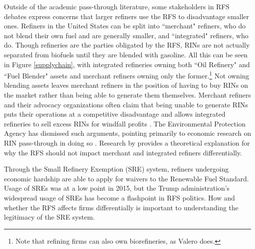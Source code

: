 \documentclass[11pt]{article}
\begin{document}
Outside of the academic pass-through literature, some stakeholders in RFS debates express concerns that larger refiners use the RFS to disadvantage smaller ones. Refiners in the United States can be split into ``merchant" refiners, who do not blend their own fuel and are generally smaller, and ``integrated" refiners, who do. Though refineries are the parties obligated by the RFS, RINs are not actually separated from biofuels until they are blended with gasoline. All this can be seen in Figure \ref{supplychain}, with integrated refineries owning both ``Oil Refinery" and ``Fuel Blender" assets and merchant refiners owning only the former.\footnote{Note that refining firms can also own biorefineries, as Valero does.}  Not owning blending assets leaves merchant refiners in the position of having to buy RINs on the market rather than being able to generate them themselves. Merchant refiners and their advocacy organizations often claim that being unable to generate RINs puts their operations at a competitive disadvantage and allows integrated refineries to sell excess RINs for windfall profits \citep[see discussion and footnotes in][p. 21-31]{EnvironmentalProtectionAgency2017}. The Environmental Protection Agency has dismissed such arguments, pointing primarily to economic research on RIN pass-through in doing so \citep{EnvironmentalProtectionAgency2017}. Research by \cite{Babcock2016} provides a theoretical explanation for why the RFS should not impact merchant and integrated refiners differentially. 

Through the Small Refinery Exemption (SRE) system, refiners undergoing economic hardship are able to apply for waivers to the Renewable Fuel Standard. Usage of SREs was at a low point in 2015, but the Trump administration's widespread usage of SREs has become a flashpoint in RFS politics. How and whether the RFS affects firms differentially is important to understanding the legitimacy of the SRE system.
\end{document}
